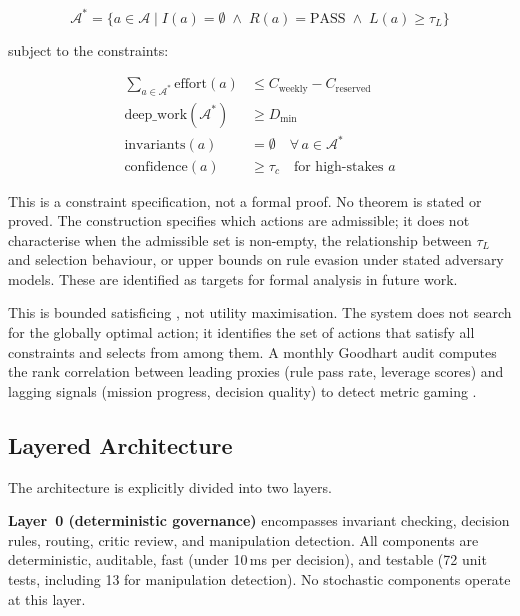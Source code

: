 \documentclass[11pt,a4paper]{article}
\begin{document}
\begin{equation}
\mathcal{A}^* = \{ a \in \mathcal{A} \mid I(a) = \emptyset \;\wedge\; R(a) = \text{PASS} \;\wedge\; L(a) \geq \tau_L \}
\end{equation}

\noindent subject to the constraints:

\begin{align}
\sum_{a \in \mathcal{A}^*} \text{effort}(a) &\leq C_{\text{weekly}} - C_{\text{reserved}} \\
\text{deep\_work}(\mathcal{A}^*) &\geq D_{\min} \\
\text{invariants}(a) &= \emptyset \quad \forall\, a \in \mathcal{A}^* \\
\text{confidence}(a) &\geq \tau_c \quad \text{for high-stakes } a
\end{align}

This is a constraint specification, not a formal proof. No theorem is stated or proved. The construction specifies which actions are admissible; it does not characterise when the admissible set is non-empty, the relationship between $\tau_L$ and selection behaviour, or upper bounds on rule evasion under stated adversary models. These are identified as targets for formal analysis in future work.

This is bounded satisficing \citep{simon1956rational}, not utility maximisation. The system does not search for the globally optimal action; it identifies the set of actions that satisfy all constraints and selects from among them. A monthly Goodhart audit \citep{manheim2018goodhart} computes the rank correlation between leading proxies (rule pass rate, leverage scores) and lagging signals (mission progress, decision quality) to detect metric gaming \citep{goodhart1975problems, strathern1997improving}.

\subsection{Layered Architecture}

The architecture is explicitly divided into two layers.

\textbf{Layer~0 (deterministic governance)} encompasses invariant checking, decision rules, routing, critic review, and manipulation detection. All components are deterministic, auditable, fast (under 10\,ms per decision), and testable (72 unit tests, including 13 for manipulation detection). No stochastic components operate at this layer.
\end{document}
